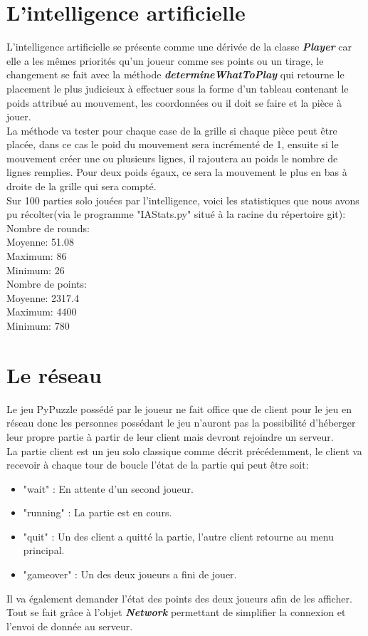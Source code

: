 \documentclass[a4paper]{report}
\begin{document}
\section{L'intelligence artificielle}
L'intelligence artificielle se présente comme une dérivée de la classe \textbf{\textit{Player}} car elle a les mêmes priorités qu'un joueur comme ses points ou un tirage, le changement se fait avec la méthode \textbf{\textit{determineWhatToPlay}} qui retourne le placement le plus judicieux à effectuer sous la forme d'un tableau contenant le poids attribué au mouvement, les coordonnées ou il doit se faire et la pièce à jouer. \\

La méthode va tester pour chaque case de la grille si chaque pièce peut être placée, dans ce cas le poid du mouvement sera incrémenté de 1, ensuite si le mouvement créer une ou plusieurs lignes, il rajoutera au poids le nombre de lignes remplies. Pour deux poids égaux, ce sera la mouvement le plus en bas à droite de la grille qui sera compté. \\

Sur 100 parties solo jouées par l'intelligence, voici les statistiques que nous avons pu récolter(via le programme "IAStats.py" situé à la racine du répertoire git): \\

Nombre de rounds:\\
Moyenne: 51.08\\
Maximum: 86\\
Minimum: 26\\

Nombre de points:\\
Moyenne: 2317.4\\
Maximum: 4400\\
Minimum: 780\\


\section{Le réseau}
Le jeu PyPuzzle possédé par le joueur ne fait office que de client pour le jeu en réseau donc les personnes possédant le jeu n'auront pas la possibilité d'héberger leur propre partie à partir de leur client mais devront rejoindre un serveur. \\

La partie client est un jeu solo classique comme décrit précédemment, le client va recevoir à chaque tour de boucle l'état de la partie qui peut être soit:
\begin{itemize}
	\item "wait" : En attente d'un second joueur.
	\item "running" : La partie est en cours.
	\item "quit" : Un des client a quitté la partie, l'autre client retourne au menu principal.
	\item "gameover" : Un des deux joueurs a fini de jouer.
\end{itemize}
Il va également demander l'état des points des deux joueurs afin de les afficher. Tout se fait grâce à l'objet \textbf{\textit{Network}} permettant de simplifier la connexion et l'envoi de donnée au serveur.\\
\end{document}
